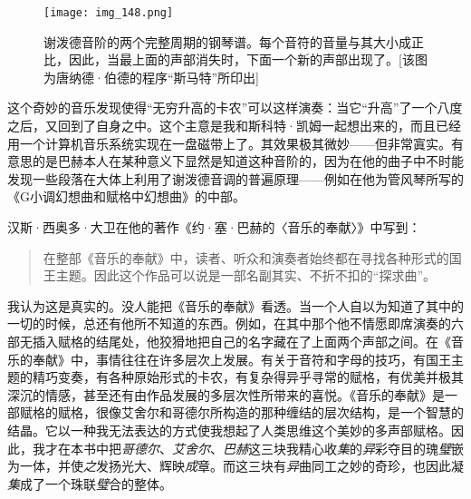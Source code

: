 \begin{sidewaysfigure}
\texttt{[image: img\_148.png]}
\caption[谢泼德音阶的两个完整周期的钢琴谱。]
  {谢泼德音阶的两个完整周期的钢琴谱。每个音符的音量与其大小成正比，因此，当最上面的声部消失时，下面一个新的声部出现了。[该图为唐纳德·伯德的程序“斯马特”所印出]}
\end{sidewaysfigure}

这个奇妙的音乐发现使得“无穷升高的卡农”可以这样演奏：当它“升高”了一个八度之后，又回到了自身之中。这个主意是我和斯科特·凯姆一起想出来的，而且已经用一个计算机音乐系统实现在一盘磁带上了。其效果极其微妙——但非常寘实。有意思的是巴赫本人在某种意义下显然是知道这种音阶的，因为在他的曲子中不时能发现一些段落在大体上利用了谢泼德音调的普遍原理——例如在他为管风琴所写的《G小调幻想曲和赋格中幻想曲》的中部。

汉斯·西奥多·大卫在他的著作《约·塞·巴赫的〈音乐的奉献〉》中写到：

\begin{quote}
在整部《音乐的奉献》中，读者、听众和演奏者始终都在寻找各种形式的国王主题。因此这个作品可以说是一部名副其实、不折不扣的“探求曲”。
\end{quote}

我认为这是真实的。没人能把《音乐的奉献》看透。当一个人自以为知道了其中的一切的时候，总还有他所不知道的东西。例如，在其中那个他不情愿即席演奏的六部无插入赋格的结尾处，他狡猾地把自己的名字藏在了上面两个声部之间。在《音乐的奉献》中，事情往往在许多层次上发展。有关于音符和字母的技巧，有国王主题的精巧变奏，有各种原始形式的卡农，有复杂得异乎寻常的赋格，有优美并极其深沉的情感，甚至还有由作品发展的多层次性所带来的喜悦。《音乐的奉献》是一部赋格的赋格，很像艾舍尔和哥德尔所构造的那种缠结的层次结构，是一个智慧的结晶。它以一种我无法表达的方式使我想起了人类思维这个美妙的多声部赋格。因此，我才在本书中把\emph{哥德尔}、\emph{艾舍尔}、\emph{巴赫}这三块我精心收\emph{集}的\emph{异}彩夺目的瑰\emph{璧}嵌为一体，并使\emph{之}发扬光大、辉映\emph{成}章。而这三块有\emph{异}曲同工之妙的奇珍，也因此凝\emph{集}成了一个珠联\emph{璧}合的整体。
